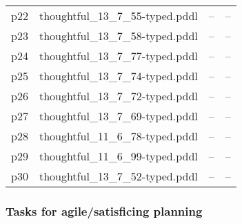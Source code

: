 \documentclass{article}
\begin{document}
\begin{center}
\begin{tabular}{@{}l|r|r|r@{}}
  p22& thoughtful\_13\_7\_55-typed.pddl&--&--\\
  p23& thoughtful\_13\_7\_58-typed.pddl&--&--\\
  p24& thoughtful\_13\_7\_77-typed.pddl&--&--\\
  p25& thoughtful\_13\_7\_74-typed.pddl&--&--\\
  p26& thoughtful\_13\_7\_72-typed.pddl&--&--\\
  p27& thoughtful\_13\_7\_69-typed.pddl&--&--\\
  p28& thoughtful\_11\_6\_78-typed.pddl&--&--\\
  p29& thoughtful\_11\_6\_99-typed.pddl&--&--\\
  p30& thoughtful\_13\_7\_52-typed.pddl&--&--
                            \end{tabular}
                            \end{center}
                    

                    \subsubsection*{Tasks for agile/satisficing planning}
                    
\end{document}
